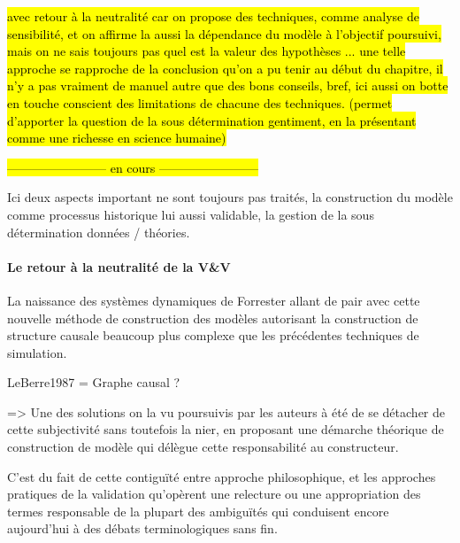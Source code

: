 \hl{ avec retour à la neutralité car on propose des techniques, comme analyse de sensibilité, et on affirme la aussi la dépendance du modèle à l'objectif poursuivi, mais on ne sais toujours pas quel est la valeur des hypothèses ... une telle approche se rapproche de la conclusion qu'on a pu tenir au début du chapitre, il n'y a pas vraiment de manuel autre que des bons conseils, bref, ici aussi on botte en touche conscient des limitations de chacune des techniques. (permet d'apporter la question de la sous détermination gentiment, en la présentant comme une richesse en science humaine)}

\hl{------------------------ en cours ------------------------}

Ici deux aspects important ne sont toujours pas traités, la construction du modèle comme processus historique lui aussi validable, la gestion de la sous détermination données / théories.


\paragraph{Le retour à la neutralité de la V\&V}



La naissance des systèmes dynamiques de Forrester allant de pair avec cette nouvelle méthode de construction des modèles autorisant la construction de structure causale beaucoup plus complexe que les précédentes techniques de simulation.

LeBerre1987 = Graphe causal ?



=> Une des solutions on la vu poursuivis par les auteurs à été de se détacher de cette subjectivité sans toutefois la nier, en proposant une démarche théorique de construction de modèle qui délègue cette responsabilité au constructeur.

C'est du fait de cette contiguïté entre approche philosophique, et les approches pratiques de la validation qu'opèrent une relecture ou une appropriation des termes responsable de la plupart des ambiguïtés qui conduisent encore aujourd'hui à des débats terminologiques sans fin. \autocite{David2009}

